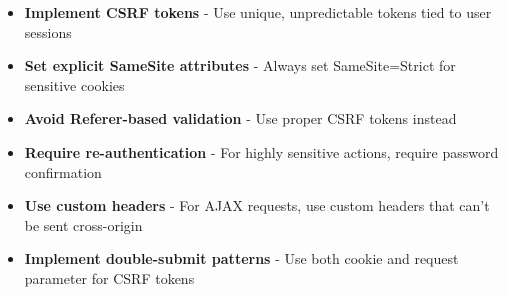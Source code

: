 \documentclass{article}
\begin{document}
\begin{itemize}
    \item \textbf{Implement CSRF tokens} - Use unique, unpredictable tokens tied to user sessions
    \item \textbf{Set explicit SameSite attributes} - Always set SameSite=Strict for sensitive cookies
    \item \textbf{Avoid Referer-based validation} - Use proper CSRF tokens instead
    \item \textbf{Require re-authentication} - For highly sensitive actions, require password confirmation
    \item \textbf{Use custom headers} - For AJAX requests, use custom headers that can't be sent cross-origin
    \item \textbf{Implement double-submit patterns} - Use both cookie and request parameter for CSRF tokens
\end{itemize}
\end{document}
